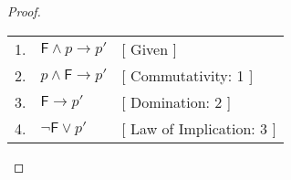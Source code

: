 \begin{proof} \hfill\par
    \begin{tabular}{rll}
        1. & \( \mathsf{F} \land p \to p' \) & [ Given ] \\
        2. & \( p \land \mathsf{F} \to p' \) & [ Commutativity: 1 ] \\
        3. & \( \mathsf{F} \to p' \) & [ Domination: 2 ] \\
        4. & \( \neg \mathsf{F} \lor p' \) & [ Law of Implication: 3 ] \\
    \end{tabular} \par
\end{proof}
